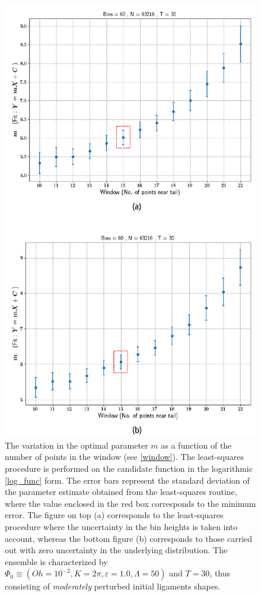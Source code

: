 

\begin{figure}
\centering
	\includegraphics{plots/drop_stats/determine_fit_log.pdf}
\caption{
	The variation in the optimal parameter $m$ as a 
	function of the number of points in the window (see \ref{window}).
	The least-squares procedure is performed on the 
	candidate function in the logarithmic \eqref{log_func} form.
	The error bars represent the standard deviation of the 
	parameter estimate obtained from the least-squares routine,
	where the value enclosed in the red box corresponds to the minimum error.
	The figure on top (a) corresponds to the least-squares procedure where the 
	uncertainty in the bin heights is taken into account, whereas the bottom 
	figure (b) corresponds to those carried out with zero uncertainty in the underlying distribution. 
	The ensemble is characterized by $\Phi_0 \equiv \left( Oh = 10^{-2}, K = 2\pi 
	, \varepsilon = 1.0 , \Lambda = 50 \right)$ and $T = 30$, 
	thus consisting of \textit{moderately} perturbed initial ligaments shapes. 
	}
\label{determine_log}
\end{figure}

